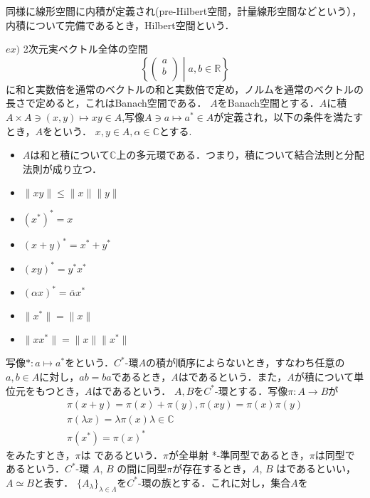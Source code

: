 同様に線形空間に内積が定義され(pre-Hilbert空間，計量線形空間などという），内積について完備であるとき，Hilbert空間という．

$ex)$ 2次元実ベクトル全体の空間
\[\left\{ \left(
\begin{array}{c}
a \\
b \\
\end{array}
\right)\mathrel{}\middle|\mathrel{}a,b\in \mathbb{R}\right\}\]
に和と実数倍を通常のベクトルの和と実数倍で定め，ノルムを通常のベクトルの長さで定めると，これはBanach空間である．
$A$をBanach空間とする．$A$に積$A \times A \ni \left(x,y\right) \mapsto xy \in A$,写像$A\ni a \mapsto a^*\in A$が定義され，以下の条件を満たすとき，$A$をという．
$x,y \in A,\alpha \in \mathbb C$とする.
\begin{itemize}
\item $A$は和と積について$\mathbb C$上の多元環である．つまり，積について結合法則と分配法則が成り立つ．
\item $\lVert xy\rVert \leq \lVert x\rVert \lVert y\rVert$
\item $\left(x^*\right)^*=x$
\item $\left(x+y\right)^*=x^*+y^*$
\item $\left(xy\right)^*=y^*x^*$
\item $\left(\alpha x\right)^*=\overline{\alpha} x^*$
\item $\lVert x^*\rVert=\lVert x\rVert$
\item $\lVert xx^*\rVert=\lVert x\rVert \lVert x^*\rVert$
\end{itemize}
写像$*:a \mapsto a^*$をという．$C^*$-環$A$の積が順序によらないとき，すなわち任意の$a,b\in A$に対し，$ab=ba$であるとき，$A$はであるという．また，$A$が積について単位元をもつとき，$A$はであるという．
$A,B$を$C^*$-環とする．写像$\pi:A \rightarrow B$が
\begin{gather*}
\pi(x+y)=\pi(x)+\pi(y),　\pi(xy)=\pi(x)\pi(y) \\
\pi(\lambda x)=\lambda \pi(x)　\lambda \in \mathbb{C} \\
\pi(x^*)=\pi(x)^*
\end{gather*}
をみたすとき，$\pi$は であるという．$\pi $が全単射 *-準同型であるとき，$\pi$は同型であるという．$C^*$-環 $A$, $B$ の間に同型$\pi$が存在するとき，$A$, $B$ はであるといい，$A\simeq B$と表す．
$\{A_{\lambda}\}_{\lambda \in \Lambda}$を$C^*$-環の族とする．これに対し，集合$A$を
